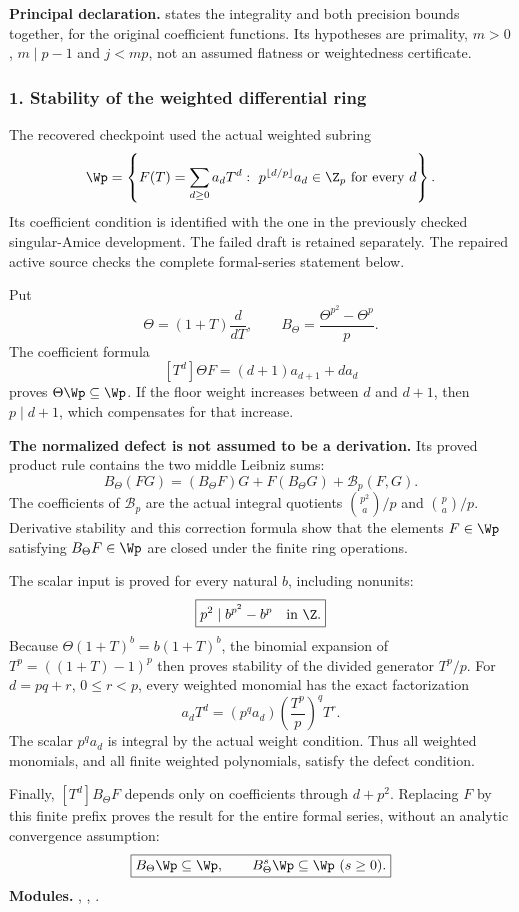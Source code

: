 \textbf{Principal declaration.}  states the integrality and both precision bounds together, for the original coefficient functions. Its hypotheses are primality, $m>0$, $m\mid p-1$ and $j<mp$, not an assumed flatness or weightedness certificate.
\par\medskip
\subsubsection*{1. Stability of the weighted differential ring}
The recovered checkpoint used the actual weighted subring
\[
 \Wp=\left\{F(T)=\sum_{d\ge0}a_dT^d:\
 p^{\lfloor d/p\rfloor}a_d\in\Z_p\ \text{for every }d\right\}.
\]
Its coefficient condition is identified with the one in the previously checked singular-Amice development. The failed  draft is retained separately. The repaired active source checks the complete formal-series statement below.

Put
\[
 \Theta=(1+T)\frac{d}{dT},\qquad
 B_\Theta=\frac{\Theta^{p^2}-\Theta^p}{p}.
\]
The coefficient formula
\[
 [T^d]\Theta F=(d+1)a_{d+1}+da_d
\]
proves $\Theta\Wp\subseteq\Wp$. If the floor weight increases between $d$ and $d+1$, then $p\mid d+1$, which compensates for that increase.

\textbf{The normalized defect is not assumed to be a derivation.}
Its proved product rule contains the two middle Leibniz sums:
\[
 B_\Theta(FG)=(B_\Theta F)G+F(B_\Theta G)+\mathcal B_p(F,G).
\]
The coefficients of $\mathcal B_p$ are the actual integral quotients
$\binom{p^2}{a}/p$ and $\binom pa/p$. Derivative stability and this correction formula show that the elements $F\in\Wp$ satisfying $B_\Theta F\in\Wp$ are closed under the finite ring operations.

The scalar input is proved for every natural $b$, including nonunits:
\[
 \boxed{p^2\mid b^{p^2}-b^p\quad\text{in }\Z.}
\]
Because $\Theta(1+T)^b=b(1+T)^b$, the binomial expansion of $T^p=((1+T)-1)^p$ then proves stability of the divided generator $T^p/p$. For $d=pq+r$, $0\le r<p$, every weighted monomial has the exact factorization
\[
 a_dT^d=(p^qa_d)\left(\frac{T^p}{p}\right)^qT^r.
\]
The scalar $p^qa_d$ is integral by the actual weight condition. Thus all weighted monomials, and all finite weighted polynomials, satisfy the defect condition.

Finally, $[T^d]B_\Theta F$ depends only on coefficients through $d+p^2$. Replacing $F$ by this finite prefix proves the result for the entire formal series, without an analytic convergence assumption:
\[
 \boxed{B_\Theta\Wp\subseteq\Wp,\qquad B_\Theta^s\Wp\subseteq\Wp\ (s\ge0).}
\]
\textbf{Modules.} , , .
\par\medskip
